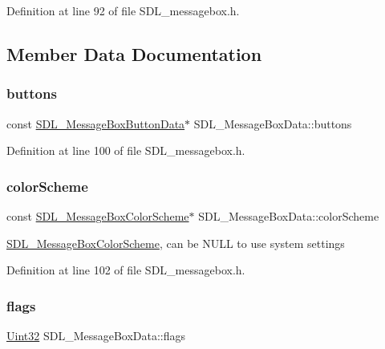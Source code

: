 Definition at line 92 of file S\+D\+L\+\_\+messagebox.\+h.



\subsection{Member Data Documentation}
\mbox{\label{struct_s_d_l___message_box_data_a265e47aab749e384661ae91d3e11e0db}} 
\subsubsection{\texorpdfstring{buttons}{buttons}}
{\footnotesize\ttfamily const \mbox{\hyperlink{struct_s_d_l___message_box_button_data}{S\+D\+L\+\_\+\+Message\+Box\+Button\+Data}}$\ast$ S\+D\+L\+\_\+\+Message\+Box\+Data\+::buttons}



Definition at line 100 of file S\+D\+L\+\_\+messagebox.\+h.

\mbox{\label{struct_s_d_l___message_box_data_a18744865a3e89e260db5f01aee579e35}} 
\subsubsection{\texorpdfstring{colorScheme}{colorScheme}}
{\footnotesize\ttfamily const \mbox{\hyperlink{struct_s_d_l___message_box_color_scheme}{S\+D\+L\+\_\+\+Message\+Box\+Color\+Scheme}}$\ast$ S\+D\+L\+\_\+\+Message\+Box\+Data\+::color\+Scheme}

\mbox{\hyperlink{struct_s_d_l___message_box_color_scheme}{S\+D\+L\+\_\+\+Message\+Box\+Color\+Scheme}}, can be N\+U\+LL to use system settings 

Definition at line 102 of file S\+D\+L\+\_\+messagebox.\+h.

\mbox{\label{struct_s_d_l___message_box_data_a113d016f760bf4e4156b0f376358d6a0}} 
\subsubsection{\texorpdfstring{flags}{flags}}
{\footnotesize\ttfamily \mbox{\hyperlink{_s_d_l__stdinc_8h_add440eff171ea5f55cb00c4a9ab8672d}{Uint32}} S\+D\+L\+\_\+\+Message\+Box\+Data\+::flags}

